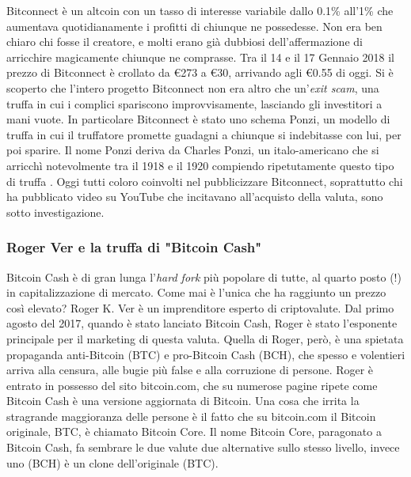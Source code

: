\documentclass {article}
\begin{document}
Bitconnect è un altcoin con un tasso di interesse variabile dallo 0.1\% all'1\% che aumentava quotidianamente i profitti di chiunque ne possedesse.
Non era ben chiaro chi fosse il creatore, e molti erano già dubbiosi dell'affermazione di arricchire magicamente chiunque ne comprasse.
Tra il 14 e il 17 Gennaio 2018 il prezzo di Bitconnect è crollato da \euro{273} a \euro{30}, arrivando agli \euro{0.55} di oggi.
Si è scoperto che l'intero progetto Bitconnect non era altro che un'\textit{exit scam}, una truffa in cui i complici spariscono improvvisamente, lasciando gli investitori a mani vuote.
In particolare Bitconnect è stato uno schema Ponzi, un modello di truffa in cui il truffatore promette guadagni a chiunque si indebitasse con lui, per poi sparire.
Il nome Ponzi deriva da Charles Ponzi, un italo-americano che si arricchì notevolmente tra il 1918 e il 1920 compiendo ripetutamente questo tipo di truffa \cite{ponzi}.
Oggi tutti coloro coinvolti nel pubblicizzare Bitconnect, soprattutto chi ha pubblicato video su YouTube che incitavano all'acquisto della valuta, sono sotto investigazione.

\subsubsection {Roger Ver e la truffa di "Bitcoin Cash"}

Bitcoin Cash è di gran lunga l'\textit{hard fork} più popolare di tutte, al quarto posto (!) in capitalizzazione di mercato. Come mai è l'unica che ha raggiunto un prezzo così elevato?
Roger K. Ver è un imprenditore esperto di criptovalute.
Dal primo agosto del 2017, quando è stato lanciato Bitcoin Cash, Roger è stato l'esponente principale per il marketing di questa valuta.
Quella di Roger, però, è una spietata propaganda anti-Bitcoin (BTC) e pro-Bitcoin Cash (BCH), che spesso e volentieri arriva alla censura, alle bugie più false e alla corruzione di persone.
Roger è entrato in possesso del sito bitcoin.com, che su numerose pagine ripete come Bitcoin Cash è una versione aggiornata di Bitcoin. Una cosa che irrita la stragrande maggioranza delle persone è il fatto che su bitcoin.com il Bitcoin originale, BTC, è chiamato Bitcoin Core.
Il nome Bitcoin Core, paragonato a Bitcoin Cash, fa sembrare le due valute due alternative sullo stesso livello, invece uno (BCH) è un clone dell'originale (BTC).
\end{document}
